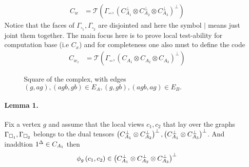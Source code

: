 \documentclass{article}
\begin{document}
\begin{multicols*}{2}
\begin{equation*}
\begin{split}
	    C_{w} &=  \mathcal{T}\left( \Gamma_{\square \square}, \left(  C_{A_1}^{\perp} \otimes C_{A_2}^{\perp} \otimes C_{A_3}^{\perp} \right)^{\perp}  \right)   
	  \end{split}
	\end{equation*}
	Notice that the faces of $\Gamma_{\square_{1}},\Gamma_{\square_{2}}$ are disjointed and here the symbol $|$ means just joint them together. 
	The main focus here is to prove local test-ability for computation base (i.e $C_{x}$) and for completeness one also must to define the code 
	\begin{equation*}
	  \begin{split}
	    C_{w_{z}} &=  \mathcal{T}\left( \Gamma_{\square \square}, \left(  C_{A_1} \otimes C_{A_2} \otimes C_{A_3} \right)^{\perp}  \right)   
	  \end{split}
	\end{equation*}
\begin{figure}[H]
\begin{center}
\end{center}
\caption{Square of the complex, with edges $(g,ag), (agb, gb) \in E_A,
(g,gb), (agb, ag) \in E_B.$ \label{fig:square}
}
\end{figure}

\paragraph{Lemma 1.} Fix a vertex $g$ and assume that the local views $c_1,c_2$ that lay over the graphs $\Gamma_{\square_{1}}, \Gamma_{\square_{2}}$ belongs to the dual tensors $\left( C_{A_{1}}^{\perp} \otimes C_{A_{2}}^{\perp} \right)^\perp, \left( C_{A_{1}}^{\perp} \otimes C_{A_{3}}^{\perp} \right)^\perp$. And inaddtion $ 1^{\Delta} \in C_{A_{1}} $ then 
      \begin{equation*}
      \phi_{g}\left( c_1, c_2 \right) \in \left( C_{A_{1}}^{\perp} \otimes C_{A_{2}}^{\perp} \otimes C_{A_{3}}^{\perp} \right)^\perp
    \end{equation*}

\end{multicols*}
\end{document}
